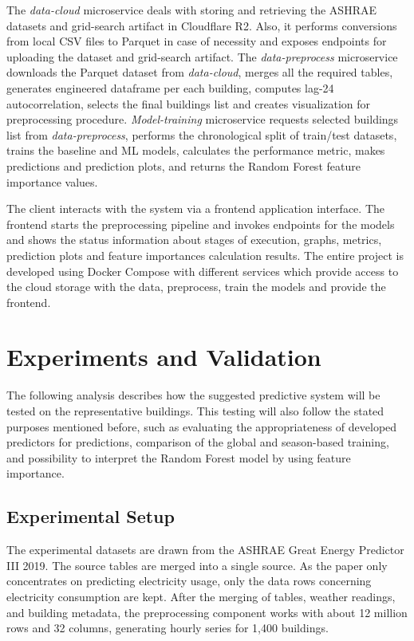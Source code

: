 \documentclass[conference]{IEEEtran}
\begin{document}
The \textit{data-cloud} microservice deals with storing and retrieving the ASHRAE datasets and grid-search artifact in Cloudflare R2. Also, it performs conversions from local CSV files to Parquet in case of necessity and exposes endpoints for uploading the dataset and grid-search artifact. The \textit{data-preprocess} microservice downloads the Parquet dataset from \textit{data-cloud}, merges all the required tables, generates engineered dataframe per each building, computes lag-24 autocorrelation, selects the final buildings list and creates visualization for preprocessing procedure. \textit{Model-training} microservice requests selected buildings list from \textit{data-preprocess}, performs the chronological split of train/test datasets, trains the baseline and ML models, calculates the performance metric, makes predictions and prediction plots, and returns the Random Forest feature importance values.


The client interacts with the system via a  frontend application interface. The frontend
starts the preprocessing pipeline and invokes endpoints for the models and shows
the status information about stages of execution, graphs, metrics, prediction
plots and feature importances calculation results. The entire project is developed using
Docker Compose with different services which provide access to the cloud storage with the data, preprocess, train the models and provide the frontend.


\section{Experiments and Validation}
\label{sec:experiments-validation}

The following analysis describes how the suggested predictive system will be tested on the representative buildings. This testing will also follow the stated purposes mentioned before, such as evaluating the appropriateness of developed predictors for predictions, comparison of the global and season-based training, and possibility to interpret the Random Forest model by using feature importance.

\subsection{Experimental Setup}

The experimental datasets are drawn from the ASHRAE Great Energy Predictor
III 2019. The source tables are merged into a single source. As the paper
only concentrates on predicting electricity usage, only the data rows concerning electricity consumption are kept. After the merging of tables,
weather readings, and building metadata, the preprocessing component works with
about 12 million rows and 32 columns, generating hourly series for 1,400
buildings.
\end{document}
